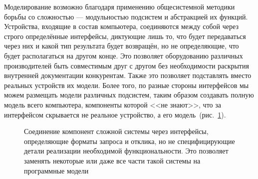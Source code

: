 \begin{digression}
Моделирование возможно благодаря применению общесистемной методики борьбы со сложностью --- модульностью подсистем и абстракцией их функций. Устройства, входящие в состав компьютера, соединяются между собой через строго определённые интерфейсы, диктующие лишь то, что будет передаваться через них и какой тип результата будет возвращён, но не определяющие, что будет располагаться на другом конце. Это позволяет оборудованию различных производителей быть совместимым друг с другом без необходимости раскрытия внутренней документации конкурентам. Также это позволяет подставлять вместо реальных устройств их модели. Более того, по разные стороны интерфейсов мы можем размещать модели различных подсистем, таким образом создавать полную модель всего компьютера, компоненты которой <<не знают>>, что за интерфейсом скрывается не реальное устройство, а его модель~(рис.~\ref{fig:interface}).

\end{digression}

\begin{figure}[htp]
\centering
{}
\caption[Соединение компонент сложной системы через интерфейсы]{Соединение компонент сложной системы через интерфейсы, определяющие форматы запроса и отклика, но не специфицирующие детали реализации необходимой функциональности. Это позволяет заменять некоторые или даже все части такой системы на программные модели}\label{fig:interface}
\end{figure}



